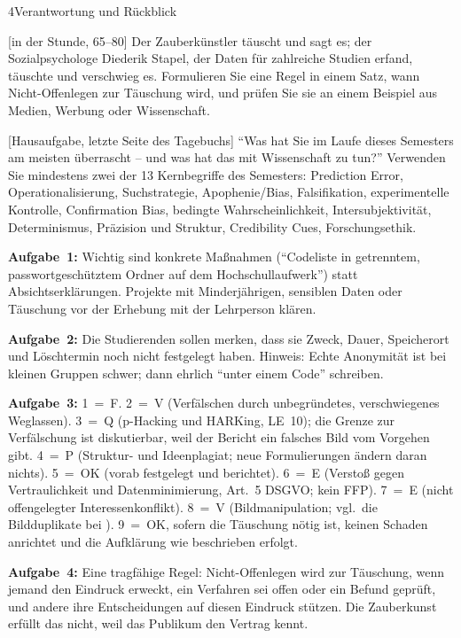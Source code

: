 \begin{uebungsblattb}{4}{Verantwortung und Rückblick}

[in der Stunde, 65--80]
Der Zauberkünstler täuscht und sagt es; der Sozialpsychologe Diederik
Stapel, der Daten für zahlreiche Studien erfand, täuschte und verschwieg es.
Formulieren Sie eine Regel in einem Satz, wann Nicht-Offenlegen zur
Täuschung wird, und prüfen Sie sie an einem Beispiel aus Medien, Werbung
oder Wissenschaft.

[Hausaufgabe, letzte Seite des Tagebuchs]
\enquote{Was hat Sie im Laufe dieses Semesters am meisten überrascht --
und was hat das mit Wissenschaft zu tun?} Verwenden Sie mindestens zwei der
13 Kernbegriffe des Semesters: Prediction Error, Operationalisierung,
Suchstrategie, Apophenie/Bias, Falsifikation, experimentelle Kontrolle,
Confirmation Bias, bedingte Wahrscheinlichkeit, Intersubjektivität,
Determinismus, Präzision und Struktur, Credibility Cues,
Forschungsethik.

\begin{lehrhinweis}[Erwartungshorizont]
\textbf{Aufgabe~1:} Wichtig sind konkrete Maßnahmen (\enquote{Codeliste in
getrenntem, passwortgeschütztem Ordner auf dem Hochschullaufwerk}) statt
Absichtserklärungen. Projekte mit Minderjährigen, sensiblen Daten oder
Täuschung vor der Erhebung mit der Lehrperson klären.

\textbf{Aufgabe~2:} Die Studierenden sollen merken, dass sie Zweck, Dauer,
Speicherort und Löschtermin noch nicht festgelegt haben. Hinweis: Echte
Anonymität ist bei kleinen Gruppen schwer; dann ehrlich \enquote{unter
einem Code} schreiben.

\textbf{Aufgabe~3:} 1~=~F. 2~=~V (Verfälschen durch unbegründetes,
verschwiegenes Weglassen). 3~=~Q (p-Hacking und HARKing, LE~10); die
Grenze zur Verfälschung ist diskutierbar, weil der Bericht ein falsches
Bild vom Vorgehen gibt. 4~=~P (Struktur- und Ideenplagiat; neue
Formulierungen ändern daran nichts). 5~=~OK (vorab festgelegt und
berichtet). 6~=~E (Verstoß gegen Vertraulichkeit und Datenminimierung,
Art.~5 DSGVO; kein FFP). 7~=~E (nicht offengelegter Interessenkonflikt).
8~=~V (Bildmanipulation; vgl.\ die Bildduplikate bei
\textcite{bik2016prevalence}). 9~=~OK, sofern die Täuschung nötig ist,
keinen Schaden anrichtet und die Aufklärung wie beschrieben erfolgt.

\textbf{Aufgabe~4:} Eine tragfähige Regel: Nicht-Offenlegen wird zur
Täuschung, wenn jemand den Eindruck erweckt, ein Verfahren sei offen oder
ein Befund geprüft, und andere ihre Entscheidungen auf diesen Eindruck
stützen. Die Zauberkunst erfüllt das nicht, weil das Publikum den Vertrag
kennt.
\end{lehrhinweis}
\end{uebungsblattb}
